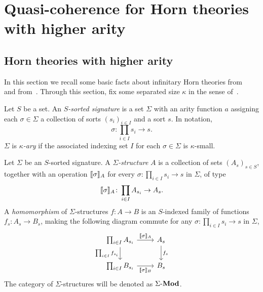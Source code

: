 \chapter{Quasi-coherence for Horn theories with higher arity}\label{ch:sqchorn}

\section{Horn theories with higher arity}\label{sec:higherhorntheory}

In this section we recall some basic facts about infinitary Horn theories from~\citet[\S3.C]{adamek1994locally} and from~\citet{ADAMEK1998379}. Through this section, fix some separated size $\kappa$ in the sense of~.

\begin{definition}
  Let $S$ be a set. An \emph{$S$-sorted signature} is a set $\Sigma$ with an arity function $a$ assigning each $\sigma\in\Sigma$ a collection of sorts $(s_i)_{i\in I}$ and a sort $s$. In notation,
  \[ \sigma \colon \prod_{i\in I}s_i \to s. \]
  $\Sigma$ is \emph{$\kappa$-ary} if the associated indexing set $I$ for each $\sigma\in\Sigma$ is $\kappa$-small.
\end{definition}

\begin{definition}
  Let $\Sigma$ be an $S$-sorted signature. A \emph{$\Sigma$-structure} $A$ is a collection of sets $(A_s)_{s\in S}$, together with an operation $\llbracket\sigma\rrbracket_A$ for every $\sigma \colon \prod_{i\in I}s_i \to s$ in $\Sigma$, of type
  \[ \llbracket\sigma\rrbracket_A \colon \prod_{i\in I}A_{s_i} \to A_s. \]
  A \emph{homomorphism} of $\Sigma$-structures $f \colon A \to B$ is an $S$-indexed family of functions $f_s \colon A_s \to B_s$, making the following diagram commute for any $\sigma \colon \prod_{i\in I}s_i \to s$ in $\Sigma$,
  \[
  \begin{tikzcd}
    \prod_{i\in I}A_{s_i} \ar[d, "\prod_{i\in I}f_{s_i}"'] \ar[r, "\ass\sigma_A"] & A_s \ar[d, "f_s"] \\
    \prod_{i\in I}B_{s_i} \ar[r, "\ass\sigma_B"'] & B_s
  \end{tikzcd}
  \]
  The category of $\Sigma$-structures will be denoted as $\Sigma\text{-}\mathbf{Mod}$.
\end{definition}

